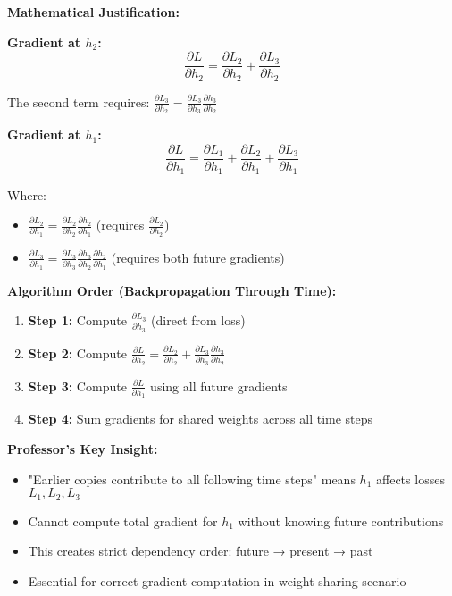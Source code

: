 \documentclass[12pt]{article}
\begin{document}
\begin{enumerate}[(a)]
{    \textbf{Mathematical Justification:}
    
    \textbf{Gradient at $h_2$:}
    $$\frac{\partial L}{\partial h_2} = \frac{\partial L_2}{\partial h_2} + \frac{\partial L_3}{\partial h_2}$$
    
    The second term requires: $\frac{\partial L_3}{\partial h_2} = \frac{\partial L_3}{\partial h_3} \frac{\partial h_3}{\partial h_2}$
    
    \textbf{Gradient at $h_1$:}
    $$\frac{\partial L}{\partial h_1} = \frac{\partial L_1}{\partial h_1} + \frac{\partial L_2}{\partial h_1} + \frac{\partial L_3}{\partial h_1}$$
    
    Where:
    \begin{itemize}
        \item $\frac{\partial L_2}{\partial h_1} = \frac{\partial L_2}{\partial h_2} \frac{\partial h_2}{\partial h_1}$ (requires $\frac{\partial L_2}{\partial h_2}$)
        \item $\frac{\partial L_3}{\partial h_1} = \frac{\partial L_3}{\partial h_3} \frac{\partial h_3}{\partial h_2} \frac{\partial h_2}{\partial h_1}$ (requires both future gradients)
    \end{itemize}
    
    \textbf{Algorithm Order (Backpropagation Through Time):}
    \begin{enumerate}
        \item \textbf{Step 1:} Compute $\frac{\partial L_3}{\partial h_3}$ (direct from loss)
        \item \textbf{Step 2:} Compute $\frac{\partial L}{\partial h_2} = \frac{\partial L_2}{\partial h_2} + \frac{\partial L_3}{\partial h_3} \frac{\partial h_3}{\partial h_2}$
        \item \textbf{Step 3:} Compute $\frac{\partial L}{\partial h_1}$ using all future gradients
        \item \textbf{Step 4:} Sum gradients for shared weights across all time steps
    \end{enumerate}
    
    \textbf{Professor's Key Insight:}
    \begin{itemize}
        \item "Earlier copies contribute to all following time steps" means $h_1$ affects losses $L_1, L_2, L_3$
        \item Cannot compute total gradient for $h_1$ without knowing future contributions
        \item This creates strict dependency order: future → present → past
        \item Essential for correct gradient computation in weight sharing scenario
    \end{itemize}
    }
    

\end{enumerate}
\end{document}
